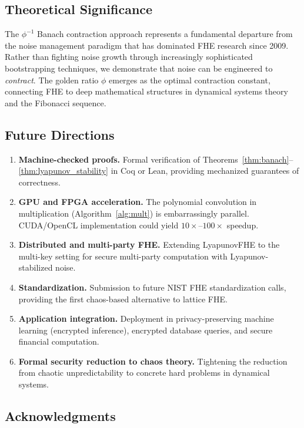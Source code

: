 \documentclass[11pt,a4paper]{article}
\begin{document}
\subsection{Theoretical Significance}

The $\phi^{-1}$ Banach contraction approach represents a fundamental departure from the noise management paradigm that has dominated FHE research since 2009. Rather than fighting noise growth through increasingly sophisticated bootstrapping techniques, we demonstrate that noise can be engineered to \emph{contract}. The golden ratio $\phi$ emerges as the optimal contraction constant, connecting FHE to deep mathematical structures in dynamical systems theory and the Fibonacci sequence.

\subsection{Future Directions}

\begin{enumerate}[leftmargin=*,itemsep=2pt]
    \item \textbf{Machine-checked proofs.} Formal verification of Theorems~\ref{thm:banach}--\ref{thm:lyapunov_stability} in Coq or Lean, providing mechanized guarantees of correctness.
    \item \textbf{GPU and FPGA acceleration.} The polynomial convolution in multiplication (Algorithm~\ref{alg:mult}) is embarrassingly parallel. CUDA/OpenCL implementation could yield $10\times$--$100\times$ speedup.
    \item \textbf{Distributed and multi-party FHE.} Extending LyapunovFHE to the multi-key setting for secure multi-party computation with Lyapunov-stabilized noise.
    \item \textbf{Standardization.} Submission to future NIST FHE standardization calls, providing the first chaos-based alternative to lattice FHE.
    \item \textbf{Application integration.} Deployment in privacy-preserving machine learning (encrypted inference), encrypted database queries, and secure financial computation.
    \item \textbf{Formal security reduction to chaos theory.} Tightening the reduction from chaotic unpredictability to concrete hard problems in dynamical systems.
\end{enumerate}

\subsection{Acknowledgments}
\end{document}
